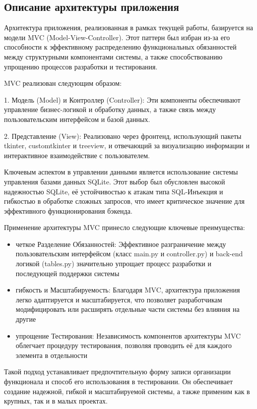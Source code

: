 \subsection{Описание архитектуры приложения}

Архитектура приложения, реализованная в рамках текущей работы, базируется на модели MVC (Model-View-Controller). Этот паттерн был избран из-за его способности к эффективному распределению функциональных обязанностей между структурными компонентами системы, а также способствованию упрощению процессов разработки и тестирования.

MVC реализован следующим образом:

1. Модель (Model) и Контроллер (Controller): Эти компоненты обеспечивают управление бизнес-логикой и обработку данных, а также связь между пользовательским интерфейсом и базой данных.

2. Представление (View): Реализовано через фронтенд, использующий пакеты tkinter, customtkinter и treeview, и отвечающий за визуализацию информации и интерактивное взаимодействие с пользователем.

Ключевым аспектом в управлении данными является использование системы управления базами данных SQLite. Этот выбор был обусловлен высокой надежностью SQLite, её устойчивостью к атакам типа \textquotedbl SQL-Инъекция \textquotedbl и гибкостью в обработке сложных запросов, что имеет критическое значение для эффективного функционирования бэкенда.

Применение архитектуры MVC принесло следующие ключевые преимущества:

\begin{itemize}
	\item четкое Разделение Обязанностей: Эффективное разграничение между пользовательским интерфейсом (класс main.py и controller.py) и back-end логикой (tables.py) значительно упрощает процесс разработки и последующей поддержки системы
	\item гибкость и Масштабируемость: Благодаря MVC, архитектура приложения легко адаптируется и масштабируется, что позволяет разработчикам
	модифицировать или расширять отдельные части системы без влияния на другие
	\item упрощение Тестирования: Независимость компонентов архитектуры MVC облегчает процедуру тестирования, позволяя проводить её для каждого элемента в отдельности
\end{itemize}

Такой подход устанавливает предпочтительную форму записи организации функционала и способ его использования в тестировании. Он обеспечивает создание надежной, гибкой и масштабируемой системы, а также применим как в крупных, так и в малых проектах.

